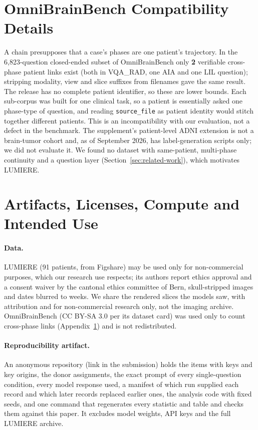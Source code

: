 \documentclass[11pt]{article}
\begin{document}
\section{OmniBrainBench Compatibility Details}
\label{sec:app-compat}

A chain presupposes that a case's phases are one patient's trajectory. In the 6,823-question closed-ended subset of OmniBrainBench \citep{peng2026omnibrainbench} only \textbf{2} verifiable cross-phase patient links exist (both in VQA\_RAD, one AIA and one LIL question); stripping modality, view and slice suffixes from filenames gave the same result. The release has no complete patient identifier, so these are lower bounds. Each sub-corpus was built for one clinical task, so a patient is essentially asked one phase-type of question, and reading \texttt{source\_file} as patient identity would stitch together different patients. This is an incompatibility with our evaluation, not a defect in the benchmark. The supplement's patient-level ADNI extension is not a brain-tumor cohort and, as of September 2026, has label-generation scripts only; we did not evaluate it. We found no dataset with same-patient, multi-phase continuity and a question layer (Section~\ref{sec:related-work}), which motivates LUMIERE.


\section{Artifacts, Licenses, Compute and Intended Use}
\label{sec:app-artifacts}

\paragraph{Data.} LUMIERE \citep{suter2022lumiere} (91 patients, from Figshare) may be used only for non-commercial purposes, which our research use respects; its authors report ethics approval and a consent waiver by the cantonal ethics committee of Bern, skull-stripped images and dates blurred to weeks. We share the rendered slices the models saw, with attribution and for non-commercial research only, not the imaging archive. OmniBrainBench (CC BY-SA 3.0 per its dataset card) was used only to count cross-phase links (Appendix~\ref{sec:app-compat}) and is not redistributed.

\paragraph{Reproducibility artifact.} An anonymous repository (link in the submission) holds the items with keys and key origins, the donor assignments, the exact prompt of every single-question condition, every model response used, a manifest of which run supplied each record and which later records replaced earlier ones, the analysis code with fixed seeds, and one command that regenerates every statistic and table and checks them against this paper. It excludes model weights, API keys and the full LUMIERE archive.
\end{document}
